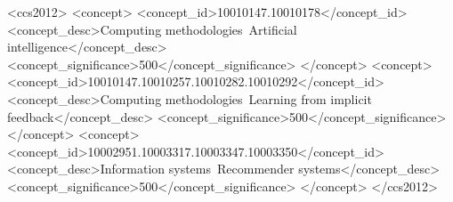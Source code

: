 \documentclass[sigconf,natbib=true]{acmart}
\begin{document}
\begin{CCSXML}
<ccs2012>
<concept>
<concept_id>10010147.10010178</concept_id>
<concept_desc>Computing methodologies~Artificial intelligence</concept_desc>
<concept_significance>500</concept_significance>
</concept>
<concept>
<concept_id>10010147.10010257.10010282.10010292</concept_id>
<concept_desc>Computing methodologies~Learning from implicit feedback</concept_desc>
<concept_significance>500</concept_significance>
</concept>
<concept>
<concept_id>10002951.10003317.10003347.10003350</concept_id>
<concept_desc>Information systems~Recommender systems</concept_desc>
<concept_significance>500</concept_significance>
</concept>
</ccs2012>
\end{CCSXML}










\maketitle
\end{document}
